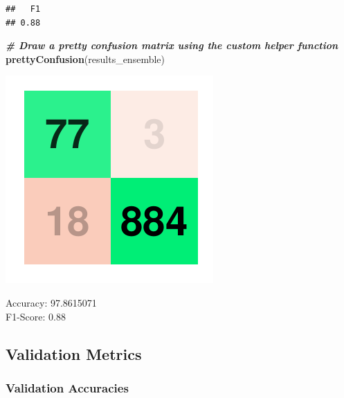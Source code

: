 \documentclass[
]{article}
\newenvironment{Shaded}{\begin{snugshade}}{\end{snugshade}}
\newcommand{\CommentTok}[1]{\textcolor[rgb]{0.00,0.40,1.00}{\textbf{\textit{#1}}}}
\newcommand{\KeywordTok}[1]{\textcolor[rgb]{0.26,0.66,0.93}{\textbf{#1}}}
\newcommand{\NormalTok}[1]{\textcolor[rgb]{0.74,0.68,0.62}{#1}}
\begin{document}
\begin{verbatim}
##   F1 
## 0.88
\end{verbatim}

\begin{Shaded}
\begin{Highlighting}[]
\CommentTok{# Draw a pretty confusion matrix using the custom helper function}
\KeywordTok{prettyConfusion}\NormalTok{(results_ensemble)}
\end{Highlighting}
\end{Shaded}

\includegraphics{Bank_Loan_Classification_files/figure-latex/unnamed-chunk-37-1.pdf}

Accuracy: 97.8615071\\
F1-Score: 0.88

\pagebreak

\hypertarget{validation-metrics}{%
\subsection{Validation Metrics}\label{validation-metrics}}

\hypertarget{validation-accuracies}{%
\subsubsection{Validation Accuracies}\label{validation-accuracies}}
\end{document}

